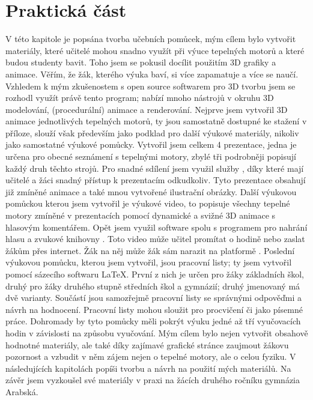 \section{Praktická část}
{V této kapitole je popsána tvorba učebních pomůcek, mým cílem bylo vytvořit materiály, které učitelé mohou snadno využít při výuce tepelných motorů a které budou studenty bavit. Toho jsem se pokusil docílit použitím 3D grafiky a animace. Věřím, že žák, kterého výuka baví, si více zapamatuje a více se naučí.}\odst
{Vzhledem k mým zkušenostem s open source softwarem  pro 3D tvorbu jsem se rozhodl využít právě tento program; nabízí mnoho nástrojů v okruhu 3D modelování, (procedurální) animace a renderování. Nejprve jsem vytvořil 3D animace jednotlivých tepelných motorů, ty jsou samostatně dostupné ke stažení v příloze, slouží však především jako podklad pro další výukové materiály, nikoliv jako samostatné výukové pomůcky.}\odst
{Vytvořil jsem celkem 4 prezentace, jedna je určena pro obecné seznámení s tepelnými motory, zbylé tři podrobněji popisují každý druh těchto strojů. Pro snadné sdílení jsem využil služby , díky které mají učitelé a žáci snadný přístup k prezentacím odkudkoliv. Tyto prezentace obsahují již zmíněné animace a také mnou vytvořené ilustrační obrázky.}\odst
{Další výukovou pomůckou kterou jsem vytvořil je výukové video, to popisuje všechny tepelné motory zmíněné v prezentacích pomocí dynamické a svižné 3D animace s hlasovým komentářem. Opět jsem využil software  spolu s programem  pro nahrání hlasu a zvukové knihovny . Toto video může učitel promítat o hodině nebo zaslat žákům přes internet. Žák na něj může žák sám narazit na platformě .}\odst
{Poslední výukovou pomůcku, kterou jsem vytvořil, jsou pracovní listy; ty jsem vytvořil pomocí sázecího softwaru \LaTeX. První z nich je určen pro žáky základních škol, druhý pro žáky druhého stupně středních škol a gymnázií; druhý jmenovaný má dvě varianty. Součástí jsou samozřejmě pracovní listy se správnými odpověďmi a návrh na hodnocení. Pracovní listy mohou sloužit pro procvičení či jako písemné práce.}\odst
{Dohromady by tyto pomůcky měli pokrýt výuku jedné až tří vyučovacích hodin v závislosti na způsobu vyučování. Mým cílem bylo nejen vytvořit obsahově hodnotné materiály, ale také díky zajímavé grafické stránce zaujmout žákovu pozornost a vzbudit v něm zájem nejen o tepelné motory, ale o celou fyziku. V následujících kapitolách popíši tvorbu a návrh na použití mých materiálů. Na závěr jsem vyzkoušel své materiály v praxi na žácích druhého ročníku gymnázia Arabská.}